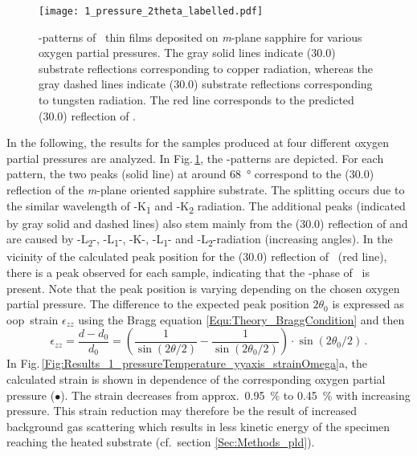 \begin{figure}
    \centering
    \texttt{[image: 1\_pressure\_2theta\_labelled.pdf]}
    \caption{
        \thetaomega-patterns of \cro\ thin films deposited on \textit{m}-plane sapphire for various oxygen partial pressures.
        The gray solid lines indicate (30.0) substrate reflections corresponding to copper radiation, whereas the gray dashed lines indicate (30.0) substrate reflections corresponding to tungsten radiation.
        The red line corresponds to the predicted (30.0) reflection of \cro.}
    \label{Fig:Results_1_pressure_2theta}
\end{figure}
In the following, the results for the samples produced at four different oxygen partial pressures are analyzed.
In Fig.\,\ref{Fig:Results_1_pressure_2theta}, the \thetaomega-patterns are depicted.
For each pattern, the two peaks (solid line) at around \qty{68}{\degree} correspond to the (30.0) reflection of the \textit{m}-plane oriented sapphire substrate.
The splitting occurs due to the similar wavelength of -K\textalpha\textsubscript{1} and -K\textalpha\textsubscript{2} radiation.
The additional peaks (indicated by gray solid and dashed lines) also stem mainly from the (30.0) reflection of  and are caused by
-L\textbeta\textsubscript{2}-,
-L\textbeta\textsubscript{1}-,
-K\textbeta-,
-L\textalpha\textsubscript{1}- and
-L\textalpha\textsubscript{2}-radiation (increasing angles).
In the vicinity of the calculated peak position for the (30.0) reflection of \cro\ (red line), there is a peak observed for each sample, indicating that the \textalpha-phase of \cro\ is present.
Note that the peak position is varying depending on the chosen oxygen partial pressure.
The difference to the expected peak position $2\theta_0$ is expressed as \gls{oop}\ strain $\epsilon_{zz}$ using the Bragg equation \eqref{Equ:Theory_BraggCondition} and then
\begin{equation}
    \label{Equ:Results_oop_strain_def}
    \epsilon_{zz}
    =\frac{d-d_0}{d_0}
    =\left(\frac{1}{\sin(2\theta/2)}-\frac{1}{\sin(2\theta_0/2)}\right)
    \cdot\sin(2\theta_0/2)\,.
\end{equation}
In Fig.\,\ref{Fig:Results_1_pressureTemperature_yyaxis_strainOmega}a, the calculated strain is shown in dependence of the corresponding oxygen partial pressure ($\bullet$).
The strain decreases from approx.\ \qty{0.95}{\percent} to \qty{0.45}{\percent} with increasing pressure.
This strain reduction may therefore be the result of increased background gas scattering which results in less kinetic energy of the specimen reaching the heated substrate (cf.\ section \ref{Sec:Methods_pld}).
